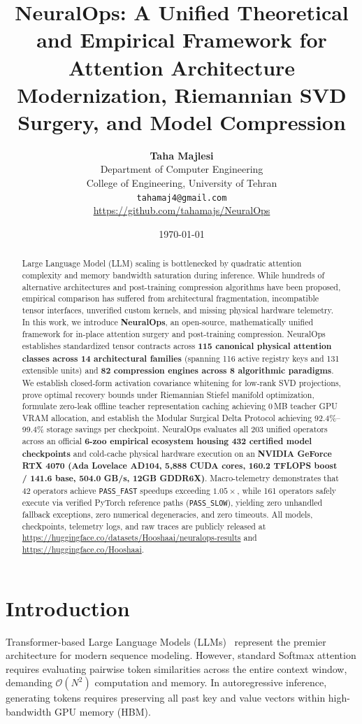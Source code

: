 \documentclass{article}
\title{\textbf{NeuralOps: A Unified Theoretical and Empirical Framework for Attention Architecture Modernization, Riemannian SVD Surgery, and Model Compression}}
\author{
  \textbf{Taha Majlesi} \\
  Department of Computer Engineering \\
  College of Engineering, University of Tehran \\
  \texttt{tahamaj4@gmail.com} \\
  \url{https://github.com/tahamajs/NeuralOps}
}
\date{\today}
\newcommand{\passfast}{\texttt{PASS\_FAST}}
\newcommand{\passslow}{\texttt{PASS\_SLOW}}
\begin{document}
\maketitle

\begin{abstract}
Large Language Model (LLM) scaling is bottlenecked by quadratic attention complexity and memory bandwidth saturation during inference. While hundreds of alternative architectures and post-training compression algorithms have been proposed, empirical comparison has suffered from architectural fragmentation, incompatible tensor interfaces, unverified custom kernels, and missing physical hardware telemetry. In this work, we introduce \textbf{NeuralOps}, an open-source, mathematically unified framework for in-place attention surgery and post-training compression. NeuralOps establishes standardized tensor contracts across \textbf{115 canonical physical attention classes across 14 architectural families} (spanning 116 active registry keys and 131 extensible units) and \textbf{82 compression engines across 8 algorithmic paradigms}. We establish closed-form activation covariance whitening for low-rank SVD projections, prove optimal recovery bounds under Riemannian Stiefel manifold optimization, formulate zero-leak offline teacher representation caching achieving 0\,MB teacher GPU VRAM allocation, and establish the Modular Surgical Delta Protocol achieving 92.4\%--99.4\% storage savings per checkpoint. NeuralOps evaluates all 203 unified operators across an official \textbf{6-zoo empirical ecosystem housing 432 certified model checkpoints} and cold-cache physical hardware execution on an \textbf{NVIDIA GeForce RTX 4070 (Ada Lovelace AD104, 5,888 CUDA cores, 160.2 TFLOPS boost / 141.6 base, 504.0 GB/s, 12GB GDDR6X)}. Macro-telemetry demonstrates that 42 operators achieve \passfast{} speedups exceeding $1.05\times$, while 161 operators safely execute via verified PyTorch reference paths (\passslow{}), yielding zero unhandled fallback exceptions, zero numerical degeneracies, and zero timeouts. All models, checkpoints, telemetry logs, and raw traces are publicly released at \url{https://huggingface.co/datasets/Hooshaai/neuralops-results} and \url{https://huggingface.co/Hooshaai}.
\end{abstract}

\section{Introduction}
\label{sec:introduction}
Transformer-based Large Language Models (LLMs)~\citep{vaswani2017attention} represent the premier architecture for modern sequence modeling. However, standard Softmax attention requires evaluating pairwise token similarities across the entire context window, demanding $\mathcal{O}(N^2)$ computation and memory. In autoregressive inference, generating tokens requires preserving all past key and value vectors within high-bandwidth GPU memory (HBM).
\end{document}
